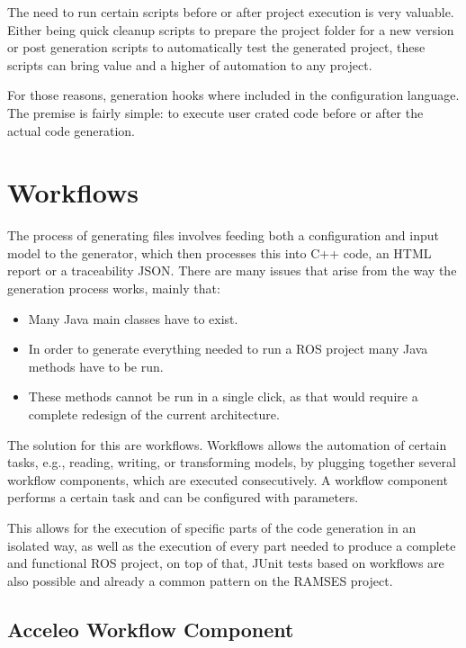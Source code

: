 The need to run certain scripts before or after project execution is very valuable. Either being quick cleanup scripts to prepare the project folder for a new version or post generation scripts to automatically test the generated project, these scripts can bring value and a higher of automation to any project.

For those reasons, generation hooks where included in the configuration language. The premise is fairly simple: to execute user crated code before or after the actual code generation.


\section{Workflows}
\label{sec:workflows}

The process of generating files involves feeding both a configuration and input model to the generator, which then processes this into C++ code, an \gls{HTML} report or a traceability \gls{JSON}. There are many issues that arise from the way the generation process works, mainly that:

\begin{itemize} 
	\item Many Java main classes have to exist.
	\item In order to generate everything needed to run a \gls{ROS} project many Java methods have to be run.
	\item These methods cannot be run in a single click, as that would require a complete redesign of the current architecture.
\end{itemize}


The solution for this are workflows. Workflows allows the automation of certain tasks, e.g., reading, writing, or transforming models, by plugging together several workflow components, which are executed consecutively. A workflow component performs a certain task and can be configured with parameters.

This allows for the execution of specific parts of the code generation in an isolated way, as well as the execution of every part needed to produce a complete and functional \gls{ROS} project, on top of that, \gls{JUnit} tests based on workflows are also possible and already a common pattern on the \gls{RAMSES} project.

\subsection{Acceleo Workflow Component}
\label{sec:workflows_acceleo}

